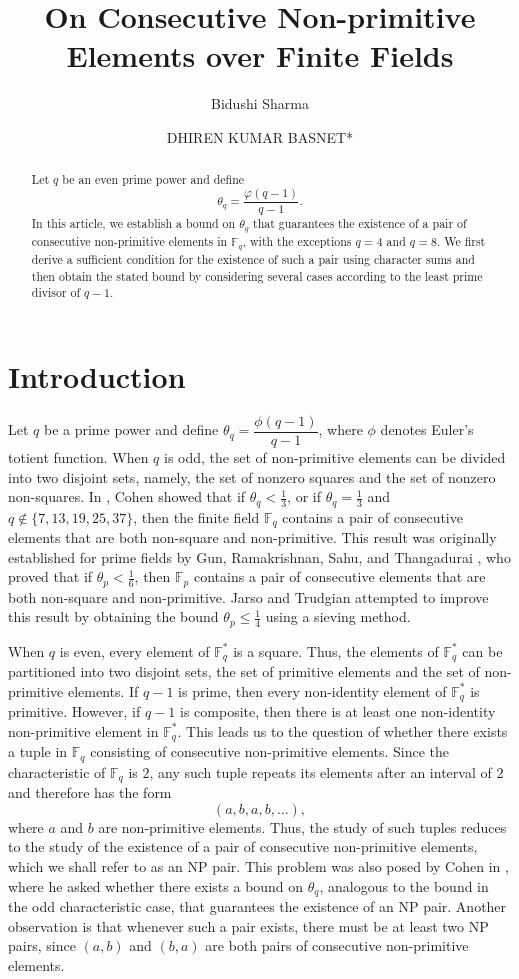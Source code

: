 \documentclass[12pt]{amsart}
\title{On Consecutive Non-primitive Elements over Finite Fields}
\author{Bidushi Sharma}
\author{DHIREN KUMAR BASNET*}
\theoremstyle{definition}
\theoremstyle{remark}
\numberwithin{equation}{section}
\begin{document}
	\begin{abstract}
Let $q$ be an even prime power and define
\[
\theta_q=\frac{\varphi(q-1)}{q-1}.
\]
In this article, we establish  a bound on $\theta_q$ that guarantees the existence of a pair of consecutive non-primitive elements in $\mathbb{F}_q$, with the exceptions $q=4$ and $q=8$. We first derive a sufficient condition for the existence of such a pair using character sums and then obtain the stated bound by considering several cases according to the least prime divisor of $q-1$.
\end{abstract}
	\maketitle
	
	\section{Introduction}
  Let $q$ be a prime power and define
$\theta_q=\dfrac{\phi(q-1)}{q-1}$,
where $\phi$ denotes Euler's totient function. When $q$ is odd, the set of non-primitive elements can be divided into two disjoint sets, namely, the set of nonzero squares and the set of nonzero non-squares. In \cite{co}, Cohen showed that if $\theta_q < \frac{1}{3}$, or if $\theta_q = \frac{1}{3}$ and $q \notin \{7,13,19,25,37\}$, then the finite field $\mathbb{F}_q$ contains a pair of consecutive elements that are both non-square and non-primitive. This result was originally established for prime fields by Gun, Ramakrishnan, Sahu, and Thangadurai \cite{thg}, who proved that if $\theta_p < \frac{1}{6}$, then $\mathbb{F}_p$ contains a pair of consecutive elements that are both non-square and non-primitive. Jarso and Trudgian \cite{tru} attempted to improve this result by obtaining the bound $\theta_p \leq \frac{1}{4}$ using a sieving method.

    When $q$ is even, every element of $\mathbb{F}_q^*$ is a square. Thus, the elements of $\mathbb{F}_q^*$ can be partitioned into two disjoint sets, the set of primitive elements and the set of non-primitive elements. If $q-1$ is prime, then every non-identity element of $\mathbb{F}_q^*$ is primitive. However, if $q-1$ is composite, then there is at least one non-identity non-primitive element in $\mathbb{F}_q^*$. This leads us to the question of whether there exists a tuple in $\mathbb{F}_q$ consisting of consecutive non-primitive elements. Since the characteristic of $\mathbb{F}_q$ is $2$, any such tuple repeats its elements after an interval of $2$ and therefore has the form
\[
(a,b,a,b,\ldots),
\]
where $a$ and $b$ are non-primitive elements. Thus, the study of such tuples reduces to the study of the existence of a pair of consecutive non-primitive elements, which we shall refer to as an NP pair. This problem was also posed by Cohen in \cite{co}, where he asked whether there exists a bound on $\theta_q$, analogous to the bound in the odd characteristic case, that guarantees the existence of an NP pair. Another observation is that whenever such a pair exists, there must be at least two NP pairs, since $(a,b)$ and $(b,a)$ are both pairs of consecutive non-primitive elements. 
\end{document}
